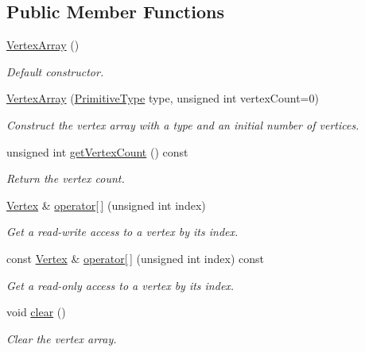 \subsection*{Public Member Functions}
\begin{DoxyCompactItemize}
\item 
\hyperlink{classsf_1_1VertexArray_a15729e01df8fc0021f9774dfb56295c1}{Vertex\-Array} ()
\begin{DoxyCompactList}\small\item\em Default constructor. \end{DoxyCompactList}\item 
\hyperlink{classsf_1_1VertexArray_abf85f4baff4c282e2d07ea97b5913aad}{Vertex\-Array} (\hyperlink{group__graphics_ga5ee56ac1339984909610713096283b1b}{Primitive\-Type} type, unsigned int vertex\-Count=0)
\begin{DoxyCompactList}\small\item\em Construct the vertex array with a type and an initial number of vertices. \end{DoxyCompactList}\item 
unsigned int \hyperlink{classsf_1_1VertexArray_a683fa176683f3b0343bab164608378f9}{get\-Vertex\-Count} () const 
\begin{DoxyCompactList}\small\item\em Return the vertex count. \end{DoxyCompactList}\item 
\hyperlink{classsf_1_1Vertex}{Vertex} \& \hyperlink{classsf_1_1VertexArray_a5db1da21b170ecf4c52d49030db385fd}{operator\mbox{[}$\,$\mbox{]}} (unsigned int index)
\begin{DoxyCompactList}\small\item\em Get a read-\/write access to a vertex by its index. \end{DoxyCompactList}\item 
const \hyperlink{classsf_1_1Vertex}{Vertex} \& \hyperlink{classsf_1_1VertexArray_a0e95bde955c929651b0d9f8f00a354be}{operator\mbox{[}$\,$\mbox{]}} (unsigned int index) const 
\begin{DoxyCompactList}\small\item\em Get a read-\/only access to a vertex by its index. \end{DoxyCompactList}\item 
void \hyperlink{classsf_1_1VertexArray_a3654c424aca1f9e468f369bc777c839c}{clear} ()
\begin{DoxyCompactList}\small\item\em Clear the vertex array. \end{DoxyCompactList}\item 

\end{DoxyCompactItemize}
